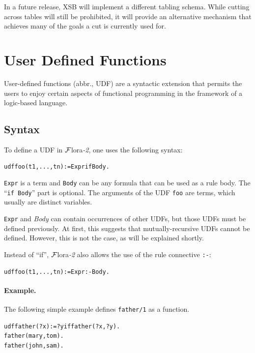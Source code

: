 \documentclass[11pt]{article}
\newcommand{\FLORA}{{\mbox{\sc ${\cal F}${lora}\rm\emph{-2}}}\xspace}
\begin{document}
In a future release, XSB will implement a different tabling schema. While
cutting across tables will still be prohibited, it will provide an
alternative mechanism that achieves many of the goals a cut is currently  used for.


\section{User Defined Functions} \label{sec:udf}


User-defined functions (abbr., UDF) are a syntactic extension that permits
the users to enjoy certain aspects of functional programming in the
framework of a logic-based language.
 

\subsection{Syntax}\label{sec-udf}
To define a UDF in
\FLORA, one uses the following syntax:

\begin{alltt}
    udf foo(t1,...,tn) := Expr if Body.
\end{alltt}

\noindent
\texttt{Expr} is a term and \texttt{Body} can be any formula that can be
used as a rule body.
The ``\texttt{if Body}'' part is optional.
The arguments of the UDF \texttt{foo} are
terms, which usually are distinct variables.

\texttt{Expr} and \emph{Body} can contain occurrences of other UDFs, but those
UDFs must be defined previously. At first, this suggests that
mutually-recursive UDFs cannot be defined. However, this is not the case,
as will be explained shortly.

\medskip

\noindent
Instead of ``if'', \FLORA also allows the use of the rule connective
\texttt{:-}: 
\begin{alltt}
    udf foo(t1,...,tn) := Expr :- Body.
\end{alltt}

\paragraph{Example.}
The following simple example defines \texttt{father/1} as a function.
\begin{alltt}
    udf father(?x):=?y if father(?x,?y).
    father(mary,tom).
    father(john,sam).
\end{alltt}
\end{document}
